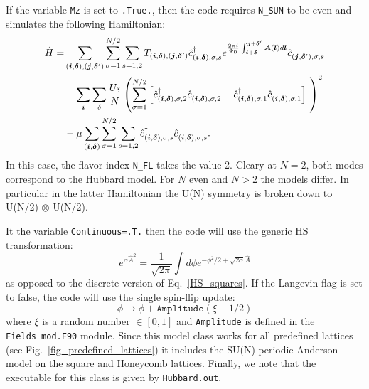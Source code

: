 If the variable \texttt{Mz} is set to \texttt{.True.}, then the code requires  \texttt{N\_SUN}  to be even and simulates the following Hamiltonian: 
\begin{align}
\hat{H} =& \sum_{(\ve{i},\ve{\delta}), (\ve{j},\ve{\delta}')}  \sum_{\sigma =1}^{N/2}  \sum_{s=1,2} T_{(\ve{i},\ve{\delta}), (\ve{j},\ve{\delta}')}    \hat{c}^{\dagger}_{(\ve{i},\ve{\delta}), \sigma,s }   e^{\frac{2 \pi i}{\Phi_0} \int_{\ve{i} + \ve{\delta}}^{\ve{j} + \ve{\delta}'}  
     \vec{A}(\ve{l})  d \ve{l}} \hat{c}^{}_{(\ve{j},\ve{\delta}'),\sigma,s}     \nonumber   \\
    &- \sum_{\vec{i}} \sum_{\delta}   \frac{U_\delta}{N} \left(\sum_{\sigma=1}^{N/2}  \left[   \hat{c}^{\dagger}_{(\vec{i},\ve{\delta}),\sigma, 2} 
    \hat{c}^{\phantom\dagger}_{(\vec{i}, \ve{\delta}),\sigma,2 }  -  \hat{c}^{\dagger}_{(\vec{i},\ve{\delta}),\sigma, 1} 
    \hat{c}^{\phantom\dagger}_{(\vec{i}, \ve{\delta}),\sigma,1} \right] \right)^2  \nonumber \\
    & - \mu \sum_{(\ve{i},\ve{\delta})}  \sum_{\sigma =1}^{N/2}  \sum_{s=1,2}\hat{c}^{\dagger}_{(\vec{i},\ve{\delta}),\sigma, s} \hat{c}^{\phantom\dagger}_{(\vec{i},\ve{\delta}),\sigma, s}.
\end{align}
In this case, the flavor index \texttt{N\_FL}   takes the value 2. Cleary at $N=2$, both modes  correspond  to the Hubbard model.  For $N$  even and $N > 2$  the models differ.  In particular  in the latter  Hamiltonian the U(N) symmetry is broken down to  U(N/2) $\otimes$ U(N/2).  

It the variable \texttt{Continuous=.T.}   then the code will use  the   generic  HS transformation: 
\begin{equation}
	e^{\alpha\hat{A}^2 }   = \frac{1}{\sqrt{2 \pi}} \int d \phi e^{ - \phi^2/2  + \sqrt{2\alpha} \hat{A}}
\end{equation} 
as opposed to the discrete version of Eq.~\ref{HS_squares}.
If the Langevin flag  is set to false, the code will use the single spin-flip update:
 \begin{equation}
	\phi \rightarrow  \phi  + \texttt{Amplitude} \left(  \xi - 1/2 \right)
\end{equation}
where $ \xi $ is a random number $ \in [0,1] $ and   \texttt{Amplitude}   is defined in the \texttt{Fields\_mod.F90}  module. 
Since this model class  works for all predefined lattices  (see Fig.~\ref{fig_predefined_lattices}) 
it includes the SU(N) periodic Anderson model on the square and Honeycomb lattices.
Finally, we note that the executable for this class is given by \texttt{Hubbard.out}.

